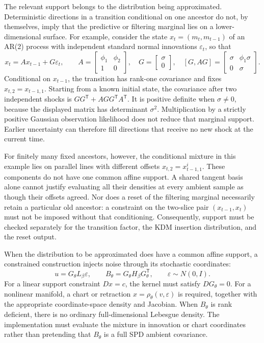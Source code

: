 \documentclass[11pt]{article}
\begin{document}
The relevant support belongs to the distribution being approximated.
Deterministic directions in a transition conditional on one ancestor do not,
by themselves, imply that the predictive or filtering marginal lies on a
lower-dimensional surface.  For example, consider the state
$x_t=(m_t,m_{t-1})$ of an AR(2) process with independent standard normal
innovations $\varepsilon_t$, so that
\begin{equation}
 x_t=A x_{t-1}+G\varepsilon_t,\qquad
 A=\begin{bmatrix}\phi_1&\phi_2\\1&0\end{bmatrix},\quad
 G=\begin{bmatrix}\sigma\\0\end{bmatrix},\quad
 [G,AG]=\begin{bmatrix}\sigma&\phi_1\sigma\\0&\sigma\end{bmatrix}.
 \label{eq:ar2-support-distinction}
\end{equation}
Conditional on $x_{t-1}$, the transition has rank-one covariance and fixes
$x_{t,2}=x_{t-1,1}$.  Starting from a known initial state, the covariance
after two independent shocks is $GG^\mathsf{T}+AGG^\mathsf{T}A^\mathsf{T}$.
It is positive definite when $\sigma\ne0$, because the displayed matrix has
determinant $\sigma^2$.  Multiplication by a strictly positive Gaussian
observation likelihood does not reduce that marginal support.  Earlier
uncertainty can therefore fill directions that receive no new shock at the
current time.

For finitely many fixed ancestors, however, the conditional mixture in this
example lies on parallel lines with different offsets $x_{t,2}=x_{t-1,1}^i$.
These components do not have one common affine support.  A shared tangent
basis alone cannot justify evaluating all their densities at every ambient
sample as though their offsets agreed.  Nor does a reset of the filtering
marginal necessarily retain a particular old ancestor: a constraint on the
two-slice pair $(x_{t-1},x_t)$ must not be imposed without that conditioning.
Consequently, support must be checked separately for the transition factor,
the KDM insertion distribution, and the reset output.

When the distribution to be approximated does have a common affine support,
a constrained construction injects noise through its stochastic coordinates:
\begin{equation}
 u=G_\theta L_\beta\varepsilon,\qquad
 B_\theta=G_\theta H_\beta G_\theta^\mathsf{T},\qquad
 \varepsilon\sim N(0,I).
 \label{eq:innovation-kernel}
\end{equation}
For a linear support constraint $D x=c$, the kernel must satisfy
$D G_\theta=0$.  For a nonlinear manifold, a chart or retraction
$x=\rho_\theta(v,\varepsilon)$ is required, together with the appropriate
coordinate-space density and Jacobian.  When $B_\theta$ is rank deficient,
there is no ordinary full-dimensional Lebesgue density.  The implementation
must evaluate the mixture in innovation or chart coordinates rather than
pretending that $B_\theta$ is a full SPD ambient covariance.
\end{document}
